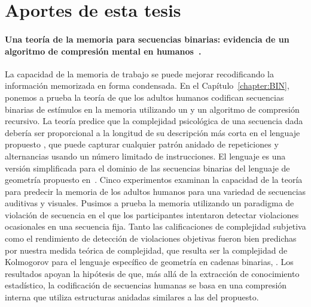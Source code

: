 \section{Aportes de esta tesis}

\paragraph{Una teoría de la memoria para secuencias binarias: evidencia de un algoritmo de compresión mental en humanos~\cite{planton2021memory}.} 
La capacidad de la memoria de trabajo se puede mejorar recodificando la información memorizada en forma condensada. En el Capítulo~\ref{chapter:BIN}, ponemos a prueba la teoría de que los adultos humanos codifican secuencias binarias de estímulos en la memoria utilizando un \lot y un algoritmo de compresión recursivo. La teoría predice que la complejidad psicológica de una secuencia dada debería ser proporcional a la longitud de su descripción más corta en el lenguaje propuesto \grambin, que puede capturar cualquier patrón anidado de repeticiones y alternancias usando un número limitado de instrucciones. El lenguaje \grambin es una versión simplificada para el dominio de las secuencias binarias del lenguaje de geometría \gramgeo propuesto en~\cite{amalric2017language}. Cinco experimentos examinan la capacidad de la teoría para predecir la memoria de los adultos humanos para una variedad de secuencias auditivas y visuales. Pusimos a prueba la memoria utilizando un paradigma de violación de secuencia en el que los participantes intentaron detectar violaciones ocasionales en una secuencia fija. Tanto las calificaciones de complejidad subjetiva como el rendimiento de detección de violaciones objetivas fueron bien predichas por nuestra medida teórica de complejidad, que resulta ser la complejidad de Kolmogorov para el lenguaje específico de geometría en cadenas binarias, \grambin. Los resultados apoyan la hipótesis de que, más allá de la extracción de conocimiento estadístico, la codificación de secuencias humanas se basa en una compresión interna que utiliza estructuras anidadas similares a las del \lot propuesto.


